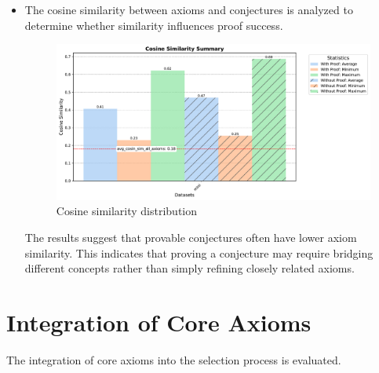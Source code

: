 \documentclass[english,version-2020-11]{uzl-thesis}
\begin{document}
\begin{itemize}
    \FloatBarrier

    \item The cosine similarity between axioms and conjectures is analyzed to determine whether similarity influences proof success.
    \begin{figure}[h!]
        \centering
        \includegraphics[width=\textwidth]{cosine_similarity_mini_noAdded_summary.pdf}
        \caption{Cosine similarity distribution}
        \label{fig:cosine_similarity}
    \end{figure}
    \FloatBarrier

    The results suggest that provable conjectures often have lower axiom similarity. This indicates that proving a conjecture may require bridging different concepts rather than simply refining closely related axioms.
\end{itemize}

\clearpage

\section{Integration of Core Axioms}

The integration of core axioms into the selection process is evaluated.
\end{document}
